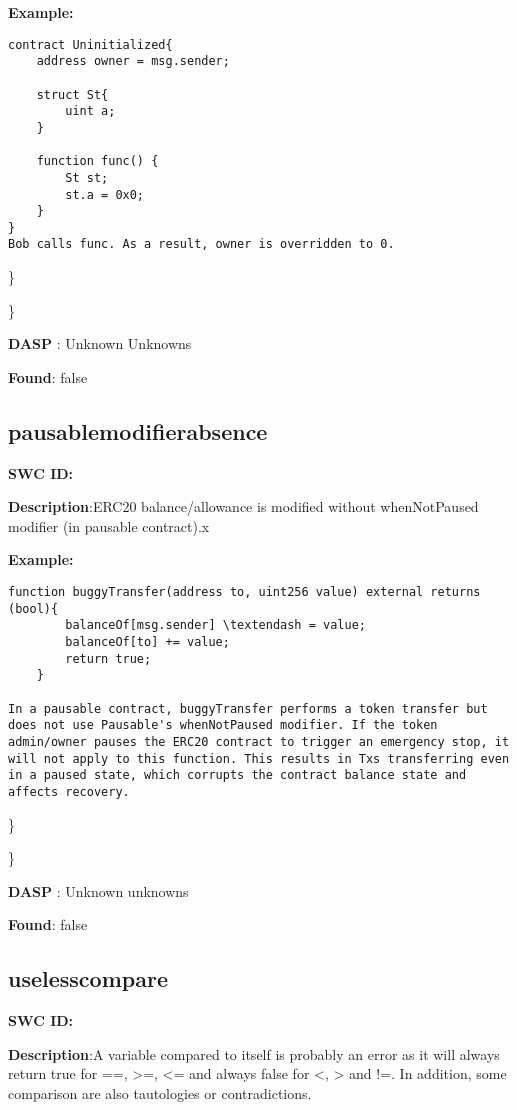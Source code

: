 \documentclass{article}
\begin{document}
\textbf{Example:} 
\begin{verbatim}
contract Uninitialized{
    address owner = msg.sender;

    struct St{
        uint a;
    }

    function func() {
        St st;
        st.a = 0x0;
    }
}
Bob calls func. As a result, owner is overridden to 0.

\end{verbatim}\} 

\} 

\textbf{DASP} : Unknown Unknowns

\textbf{Found}: false

\subsection{pausable\textunderscore modifier\textunderscore absence} 
\textbf{SWC \textunderscore ID:} 

\textbf{Description}:ERC20 balance/allowance is modified without whenNotPaused modifier (in pausable contract).x


\textbf{Example:} 
\begin{verbatim}
function buggyTransfer(address to, uint256 value) external returns (bool){
        balanceOf[msg.sender] \textendash = value;
        balanceOf[to] += value;
        return true;
    }

In a pausable contract, buggyTransfer performs a token transfer but does not use Pausable's whenNotPaused modifier. If the token admin/owner pauses the ERC20 contract to trigger an emergency stop, it will not apply to this function. This results in Txs transferring even in a paused state, which corrupts the contract balance state and affects recovery.

\end{verbatim}\} 

\} 

\textbf{DASP} : Unknown unknowns

\textbf{Found}: false

\subsection{useless\textunderscore compare} 
\textbf{SWC \textunderscore ID:} 

\textbf{Description}:A variable compared to itself is probably an error as it will always return true for ==, >=, <= and always false for <, > and !=. In addition, some comparison are also tautologies or contradictions.
\end{document}
